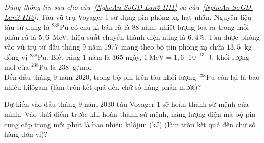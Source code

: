 	\begin{ex}%
		\label{NgheAn-SoGD-Lan2-III1}
		\textit{Dùng thông tin sau cho câu~\ref{NgheAn-SoGD-Lan2-III1} và câu~\ref{NgheAn-SoGD-Lan2-III2}:} Tàu vũ trụ Voyager 1 sử dụng pin phóng xạ hạt nhân. Nguyên liệu tàu sử dụng là ${}^{238}\text{Pu}$ có chu kì bán rã là $88$ năm, nhiệt lượng tỏa ra trong mỗi phân rã là $5{,}6$~MeV, hiệu suất chuyển thành điện năng là $6{,}4\%$. Tàu được phóng vào vũ trụ từ đầu tháng 9 năm 1977 mang theo bộ pin phóng xạ chứa $13{,}5$~kg đồng vị ${}^{238}\text{Pu}$. Biết rằng $1$ năm là $365$ ngày, $1~\text{MeV}=1{,}6\cdot 10^{-13}$~J, khối lượng mol của ${}^{238}\text{Pu}$ là $238$~g/mol.\\
		Đến đầu tháng 9 năm 2020, trong bộ pin trên tàu khối lượng ${}^{238}\text{Pu}$ còn lại là bao nhiêu kilôgam (làm tròn kết quả đến chữ số hàng phần mười)?
		\par
	\end{ex}

	\begin{ex}%
		\label{NgheAn-SoGD-Lan2-III2}
		Dự kiến vào đầu tháng 9 năm 2030 tàu Voyager 1 sẽ hoàn thành sứ mệnh của mình. Vào thời điểm trước khi hoàn thành sứ mệnh, năng lượng điện mà bộ pin cung cấp trong mỗi phút là bao nhiêu kilôjun (kJ) (làm tròn kết quả đến chữ số hàng đơn vị)?
		\par
	\end{ex}

